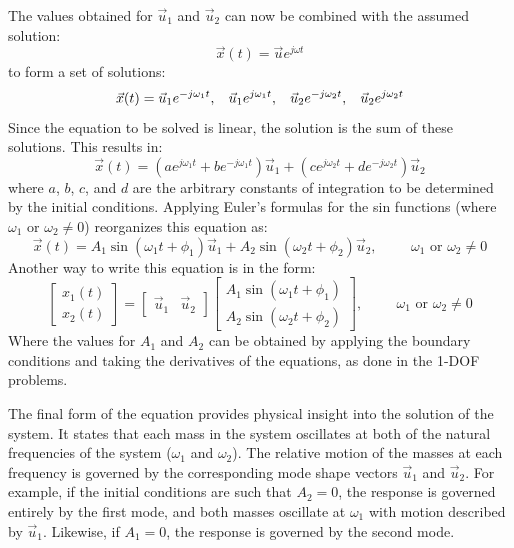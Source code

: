 \documentclass[12pt,letter]{article}
\begin{document}
The values obtained for $\vec{u}_1$ and $\vec{u}_2$ can now be combined with the assumed solution:
\begin{equation}
 \vec{x}(t) = \vec{u}e^{j\omega t}
\end{equation}
to form a set of solutions:
\begin{equation}
 \vec{x}(t) = \vec{u}_1e^{-j\omega_1 t}, \hspace{2ex} \vec{u}_1e^{j\omega_1 t}, \hspace{2ex} \vec{u}_2e^{-j\omega_2 t}, \hspace{2ex} \vec{u}_2e^{j\omega_2 t}
\end{equation}
Since the equation to be solved is linear, the solution is the sum of these solutions. This results in:
\begin{equation}
 \vec{x}(t) = (a e^{j\omega_1 t} + b e^{-j\omega_1 t})\vec{u}_1 +(c e^{j\omega_2 t} + d e^{-j\omega_2 t})\vec{u}_2
\end{equation}
where $a$, $b$, $c$, and $d$ are the arbitrary constants of integration to be determined by the initial conditions. Applying Euler's formulas for the sin functions (where $\omega_1 \text{ or } \omega_2 \neq 0$) reorganizes this equation as:
\begin{equation}
 \vec{x}(t) = A_1 \sin (\omega_1 t + \phi_1 )\vec{u}_1 + A_2 \sin (\omega_2 t + \phi_2 )\vec{u}_2 , \hspace{1cm} \omega_1 \text{ or } \omega_2 \neq 0
\end{equation}
Another way to write this equation is in the form:
\begin{equation}
 \begin{bmatrix} x_1(t) \\  x_2(t) \end{bmatrix} =  \begin{bmatrix} \vec{u}_1 & \vec{u}_2 \end{bmatrix}
 \begin{bmatrix} A_1 \sin (\omega_1 t + \phi_1 )\\ A_2 \sin (\omega_2 t + \phi_2 )\end{bmatrix}, \hspace{1cm} \omega_1 \text{ or } \omega_2 \neq 0
\end{equation}
Where the values for $A_1$ and $A_2$ can be obtained by applying the boundary conditions and taking the derivatives of the equations, as done in the 1-DOF problems. 

The final form of the equation provides physical insight into the solution of the system. It states that each mass in the system oscillates at both of the natural frequencies of the system ($\omega_1$ and $\omega_2$). The relative motion of the masses at each frequency is governed by the corresponding mode shape vectors $\vec{u}_1$ and $\vec{u}_2$. For example, if the initial conditions are such that $A_2 = 0$, the response is governed entirely by the first mode, and both masses oscillate at $\omega_1$ with motion described by $\vec{u}_1$. Likewise, if $A_1 = 0$, the response is governed by the second mode.
\end{document}
